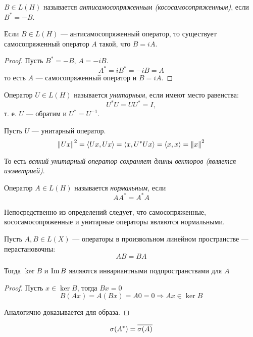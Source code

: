 \begin{definition}
    $B \in L(H)$ называется \emph{антисамосопряженным (кососамосопряженным)},
    если $B^* = -B$.
\end{definition}

\begin{lemma}
    Если $B \in L(H)$ — антисамосопряженный оператор, то существует
    самосопряженный оператор $A$ такой, что $B = iA$.    
\end{lemma}

\begin{proof}
    Пусть $B^* = -B$, $A = -i B$.
    \[ A^* = i B^* = -iB = A \]
    то есть $A$ — самосопряженный оператор и $B = iA$.
\end{proof}

\begin{definition}
    Оператор $U \in L(H)$ называется \emph{унитарным}, если имеют место равенства:
    \[ U^* U = UU^* = I, \]
    т. е. $U$ — обратим и $U^* = U^{-1}$.
\end{definition}

Пусть $U$ — унитарный оператор.
\[ \left\|Ux\right\|^2 = \langle Ux, Ux \rangle = \langle x, U^* Ux\rangle = \langle
x, x \rangle = \left\|x\right\|^2 \]

То есть \emph{всякий унитарный оператор сохраняет длины векторов (является
изометрией)}.

\begin{definition}
    Оператор $A \in L(H)$ называется \emph{нормальным}, если
    \[ AA^* = A^* A \]
\end{definition}

Непосредственно из определений следует, что самосопряженные, кососамосопряженные
и унитарные операторы являются нормальными.

\begin{lemma}\label{lemma:invariantcommute}
    Пусть $A, B \in L(X)$ — операторы в произвольном линейном пространстве — перастановочны:
    \[ AB = BA \]

    Тогда $\ker B$ и $\operatorname{Im} B$ являются инвариантными подпространствами для
    $A$
\end{lemma}

\begin{proof}
    Пусть $x \in \ker B$, тогда $Bx = 0$
    \[ B(Ax) = A(Bx) = A0 = 0 \Rightarrow Ax \in \ker B \]

    Аналогично доказывается для образа.
\end{proof}

\begin{lemma}
    \begin{equation*}
        \operatorname{\sigma}(A^*) = \overline{\operatorname{\sigma}(A)}
    \end{equation*}
\end{lemma}

